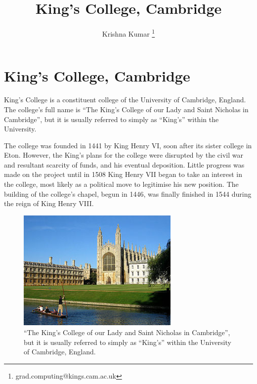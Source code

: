\documentclass{report}
\title{King's College, Cambridge}
\author{Krishna Kumar \thanks{grad.computing@kings.cam.ac.uk}}
\begin{document}
\maketitle
\listoffigures
\clearpage

\section{King's College, Cambridge}


King's College is a constituent college of the University of Cambridge, 
England. The college's full name is ``The King's College of our Lady and Saint 
Nicholas in Cambridge'', but it is usually referred to simply as ``King's''
within the University.

The college was founded in 1441 by King Henry VI, soon after its sister college 
in Eton. However, the King's plans for the college were disrupted by the civil 
war and resultant scarcity of funds, and his eventual deposition. Little 
progress was made on the project until in 1508 King Henry VII began to take an 
interest in the college, most likely as a political move to legitimise his new 
position. The building of the college's chapel, begun in 1446, was finally 
finished in 1544 during the reign of King Henry VIII.



\begin{figure}[b] %
\centering    %
\includegraphics[width=0.7\textwidth]{figs/Kings.png}
\caption[King's College Cambridge]{``The King's College of our Lady and Saint 
Nicholas in Cambridge'', but it is usually referred to simply as ``King's'' 
within the University of Cambridge, England.}
\label{fig:Kings}
\end{figure}
\end{document}
